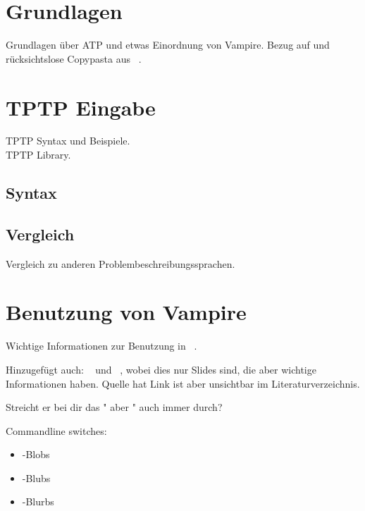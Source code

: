 \documentclass{acm_proc_article-sp-german}
\begin{document}
\section{Grundlagen}
\label{sec:foundations}

Grundlagen über ATP und etwas Einordnung von Vampire. Bezug auf und rücksichtslose Copypasta aus ~\cite{cav2013}.


\section{TPTP Eingabe}
\label{sec:input}

TPTP Syntax und Beispiele.\\
TPTP Library.

\subsection{Syntax}
\label{subsec:syntax}

\subsection{Vergleich}
\label{subsec:tptpcomp}
Vergleich zu anderen Problembeschreibungssprachen.


\section{Benutzung von Vampire}
\label{sec:invocation}

Wichtige Informationen zur Benutzung in ~\cite{hoder2011slides}.

Hinzugefügt auch: ~\cite{kovacs2011slides} und ~\cite{hodervoronkov2012slides}, wobei dies nur Slides sind, die aber wichtige Informationen haben. Quelle hat Link ist aber unsichtbar im Literaturverzeichnis.

Streicht er bei dir das " aber " auch immer durch?

Commandline switches:

\begin{itemize}
\item -Blobs
\item -Blubs
\item -Blurbs
\end{itemize}
\end{document}
